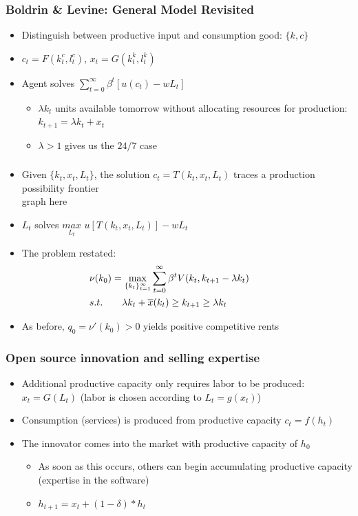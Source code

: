 \documentclass{beamer}
\begin{document}
\begin{frame}
  \frametitle{Boldrin \& Levine: General Model Revisited}
  \begin{itemize}
    \item<+-> Distinguish between productive input and consumption good: $\{k,c\}$
    \item<+-> $c_t = F(k_t^c,l_t^c)$, $x_t = G(k_t^k,l_t^k)$
    \item<+-> Agent solves $\sum_{t=0}^\infty\beta^t[u(c_t)-wL_t]$
    \begin{itemize}
      \item<+-> $\lambda k_t$ units available tomorrow without allocating resources for production: $k_{t+1} = \lambda k_t + x_t$
      \item<+-> $\lambda > 1$ gives us the $24/7$ case
    \end{itemize}
  \end{itemize}
\end{frame}

\begin{frame}
  \frametitle{}
  \begin{itemize}
    \item<+-> Given $\{k_t, x_t, L_t\}$, the solution $c_t = T(k_t,x_t,L_t)$ traces a      production possibility frontier\\
     graph here
  \item<+-> $L_t$ solves $\underset{L_t}{max}$ $u[T(k_t,x_t,L_t)]-wL_t$
  \item<+-> The problem restated:
  \begin{align*}
    &\nu(k_0)=
    \max_{\{k_t\}_{t=1}^\infty} \sum_{t=0}^\infty\beta^tV(k_t,k_{t+1} - \lambda k_t)
      \hspace{13mm}\\
    &s.t. \ \ \ \ \ \ \lambda k_t + \overline{x}(k_t) \ge k_{t+1} \ge \lambda k_t
  \end{align*}
  \item<+-> As before, $q_0 = \nu ' (k_0) > 0$ yields positive competitive rents
  \end{itemize} 
\end{frame}

\begin{frame}
  \frametitle{Open source innovation and selling expertise}
  \begin{itemize}
    \item Additional productive capacity only requires labor to be produced: $x_t = G(L_t)$ (labor is chosen according to $L_t = g(x_t)$)
    \item Consumption (services) is produced from productive capacity $c_t = f(h_t)$
    \item The innovator comes into the market with productive capacity of $h_0$
    \begin{itemize}
      \item As soon as this occurs, others can begin accumulating productive capacity (expertise in the software)
      \item $h_{t+1} = x_t + (1-\delta)*h_t$
    \end{itemize}
  \end{itemize}
\end{frame}
\end{document}
